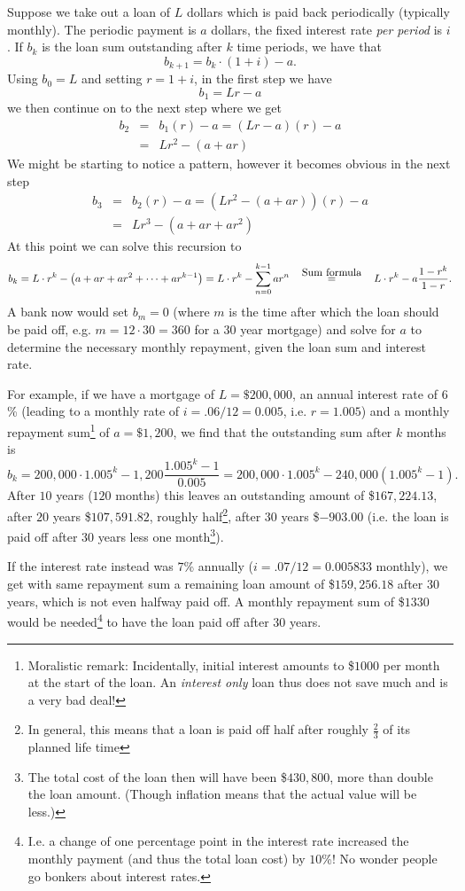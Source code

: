 \begin{Example}
Suppose we take out a loan of $L$ dollars which is paid back
periodically (typically monthly). The periodic payment is $a$
dollars, the fixed interest rate \textit{per period} is $i$. If
$b_k$ is the loan sum outstanding after $k$ time periods, we have
that
\[
b_{k+1}=b_k\cdot (1+i)-a.
\]
Using $b_0=L$ and setting $r=1+i$, in the first step we have
\[b_{1}=Lr-a\] we then continue on to the next step where we
get
\begin{eqnarray*}
b_{2}&=&b_{1}(r)-a 
=(Lr-a)(r)-a \\
&=&Lr^{2}-(a+ar)
\end{eqnarray*}
We might be starting to notice a pattern, however it becomes obvious
in the next step
\begin{eqnarray*}
b_{3}&=&b_{2}(r)-a 
=(Lr^{2}-(a+ar))(r)-a \\
&=&Lr^{3}-(a+ar+ar^{2})
\end{eqnarray*}
At this point we can solve this recursion to
\[
b_k=L\cdot r^k-\left(a+ar+ar^2+\cdots+ar^{k-1}\right)
=L\cdot r^k-\sum_{n=0}^{k-1}ar^n
\mathop{=}\limits^{\mbox{\quad Sum formula\quad}}L\cdot r^k-a\frac{1-r^k}{1-r}.
\]
A bank now would set $b_m=0$ (where $m$ is the time after which the loan
should be paid off, e.g. $m=12\cdot 30=360$ for a 30 year mortgage)
and solve for $a$ to determine the
necessary monthly repayment, given the loan sum and interest rate.

For example, if we have a mortgage of $L=\$200,000$, an annual
interest rate of $6$\% (leading to a monthly rate of
$i=.06/12=0.005$, i.e. $r=1.005$) and a monthly repayment
sum\footnote{Moralistic remark: Incidentally, initial interest amounts
to {\$}$1000$ per month at the start of the loan. An
\textit{interest only} loan thus does not save much and is a very
bad deal!} of $a=\$1,200$, we find that the outstanding sum after
$k$ months is
\[
b_k=200,000\cdot{1.005^k}-1,200\frac{1.005^k-1}{0.005}
=200,000\cdot{1.005^k}-240,000\left(1.005^k-1\right).
\]
After $10$ years ($120$ months) this leaves an outstanding amount of
{\$}$167,224.13$, after $20$ years {\$}$107,591.82$, roughly
half\footnote{In general, this means that a loan is paid off half
after roughly $\frac{2}{3}$ of its planned life time}, after $30$
years {\$}$-903.00$ (i.e. the loan is paid off after $30$ years less
one month\footnote{The total cost of the loan then will have been
{\$}$430,800$, more than double the loan amount. (Though inflation
means that the actual value will be less.)}).

If the interest rate instead was $7$\% annually ($i=.07/12=0.005833$
monthly), we get with same repayment sum a remaining loan amount of
{\$}$159,256.18$ after $30$ years, which is not even halfway paid
off. A monthly repayment sum of {\$}$1330$ would be
needed\footnote{I.e. a change of one percentage point in the
interest rate increased the monthly payment (and thus the total loan
cost) by $10$\%! No wonder people go bonkers about interest rates.}
to have the loan paid off after $30$ years.
\end{Example}


